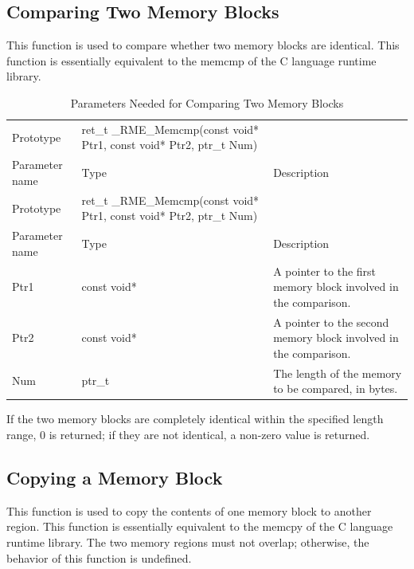 \subsection{Comparing Two Memory Blocks}\label{subsec:7-compare-two-memory-blocks}

This function is used to compare whether two memory blocks are identical. This function is essentially equivalent to the memcmp of the C language runtime library.

\begin{xltabular}{\textwidth}{@{}>{\hsize\raggedright\arraybackslash}X>{\hsize\raggedright\arraybackslash}X>{\hsize\raggedright\arraybackslash}X@{}}
\caption{Parameters Needed for Comparing Two Memory Blocks}\label{tab:7-86-compare-two-memory-blocks-parameters}\\
\toprule
Prototype & ret\_t \_RME\_Memcmp(const void* Ptr1, const void* Ptr2, ptr\_t
Num) &\tabularnewline
Parameter name & Type & Description\tabularnewline
\endfirsthead
\toprule
Prototype & ret\_t \_RME\_Memcmp(const void* Ptr1, const void* Ptr2, ptr\_t
Num) &\tabularnewline
Parameter name & Type & Description\tabularnewline
\midrule
\endhead
\bottomrule
\endlastfoot
Ptr1 & const void* & A pointer to the first memory block involved in the comparison.\tabularnewline
Ptr2 & const void* & A pointer to the second memory block involved in the comparison.\tabularnewline
Num & ptr\_t & The length of the memory to be compared, in bytes.\tabularnewline
\end{xltabular}
\nopagebreak[4]

If the two memory blocks are completely identical within the specified length range, 0 is returned; if they are not identical, a non-zero value is returned.

\subsection{Copying a Memory Block}\label{subsec:7-copy-memory-block}

This function is used to copy the contents of one memory block to another region. This function is essentially equivalent to the memcpy of the C language runtime library. The two memory regions must not overlap; otherwise, the behavior of this function is undefined.

